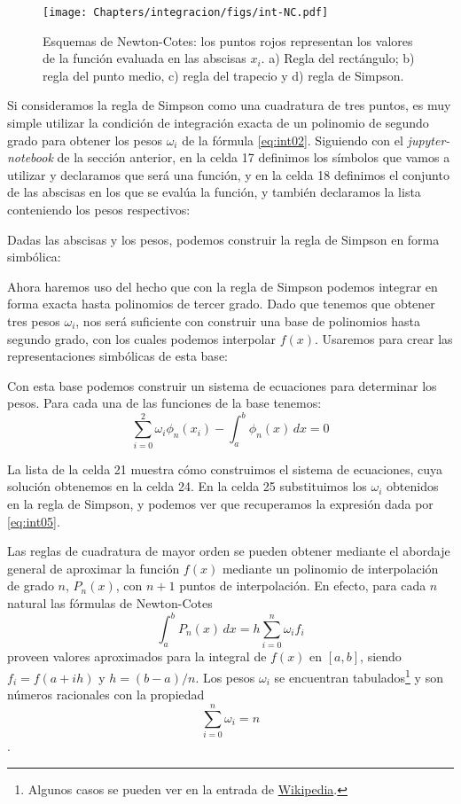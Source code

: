 \begin{figure}[t]
 \centering
 \texttt{[image: Chapters/integracion/figs/int-NC.pdf]}
 \caption{Esquemas de Newton-Cotes: los puntos rojos representan los valores de la función evaluada en las abscisas $x_i$. a) Regla del rectángulo; b) regla del punto medio, c) regla del trapecio y d) regla de Simpson.}
 \label{fig:int01}
\end{figure}


Si consideramos la regla de Simpson como una cuadratura de tres puntos, es muy simple utilizar la condición de integración exacta de un polinomio de segundo grado para obtener los pesos $\omega_i$ de la fórmula \eqref{eq:int02}. Siguiendo con el \textit{jupyter-notebook} de la sección anterior, en la celda 17 definimos los símbolos que vamos a utilizar y declaramos que  será una función, y en la celda 18 definimos el conjunto de las abscisas en los que se evalúa la función, y también declaramos la lista  conteniendo los pesos respectivos:

Dadas las abscisas y los pesos, podemos construir la regla de Simpson en forma simbólica:

Ahora haremos uso del hecho que con la regla de Simpson podemos integrar en forma exacta hasta polinomios de tercer grado. Dado que tenemos que obtener tres pesos $\omega_i$, nos será suficiente con construir una base de polinomios hasta segundo grado, con los cuales podemos interpolar $f(x)$. Usaremos  para crear las representaciones simbólicas de esta base:

Con esta base podemos construir un sistema de ecuaciones para determinar los pesos. Para cada una de las funciones de la base tenemos:
\[ \sum_{i=0}^2 \omega_i \phi_n(x_i) - \int_a^b \phi_n(x) \, dx = 0 \]

La lista  de la celda 21 muestra cómo construimos el sistema de ecuaciones, cuya solución obtenemos en la celda 24. En la celda 25 substituimos los $\omega_i$ obtenidos en la regla de Simpson, y podemos ver que recuperamos la expresión dada por \eqref{eq:int05}.


Las reglas de cuadratura de mayor orden se pueden obtener mediante el abordaje general de aproximar la función $f(x)$ mediante un polinomio de interpolación de grado $n$, $P_n(x)$, con $n + 1$ puntos de interpolación. En efecto, para cada $n$ natural las fórmulas de Newton-Cotes
\begin{equation}
 \int_a^b P_n(x) \, dx = h \sum_{i=0}^n \omega_i f_i
\end{equation} 
proveen valores aproximados para la integral de $f(x)$ en $[a, b]$, siendo $f_i = f(a + ih)$ y $h = (b - a)/n$. Los pesos $\omega_i$ se encuentran tabulados\footnote{Algunos casos se pueden ver en la entrada de \href{https://en.wikipedia.org/wiki/Newton-Cotes_formulas}{Wikipedia}.} y son números racionales con la propiedad
\begin{equation}
 \sum_{i=0}^n \omega_i = n
\end{equation}.


